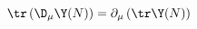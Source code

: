 \begin{equation}
  \label{eq:trDY}
  \tr\left(\D_\mu \Y(N)\right) = \partial_\mu\left(\tr \Y(N)\right)
\end{equation}

